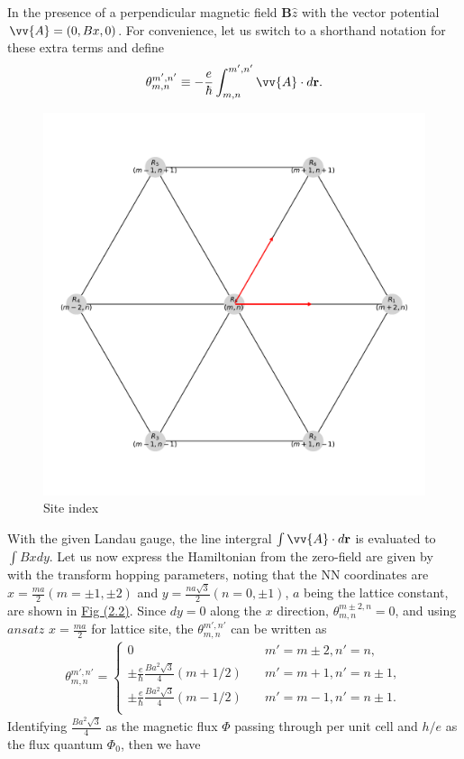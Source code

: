 \documentclass{report}
\newcommand{\f}[2]{\dfrac{#1}{#2}}
\begin{document}
In the presence of a perpendicular magnetic field $\mathbf{B} \hat{z}$ with the vector potential $\vv{A} = (0, Bx, 0)$. For convenience, let us switch to a shorthand notation for these extra terms and define
\begin{gather}
	\theta_{m,n}^{m',n'} \equiv - \f{e}{\hbar} \int_{m,n}^{m',n'} \vv{A} \cdot d\mathbf{r}.
\end{gather}
\begin{figure}[H]
	\centering
	\includegraphics[width=0.5\linewidth,height=0.5\linewidth]{pic/siteindice.pdf}
	\caption{\label{fig:site index} Site index}
\end{figure}
With the given Landau gauge, the line intergral $\int \vv{A} \cdot d\mathbf{r}$ is evaluated to $\int Bx dy$. Let us now express the Hamiltonian from the zero-field are given by \cite{PhysRevB.88.085433} with the transform hopping parameters, noting that the NN coordinates are $x = \frac{ma}{2}(m = \pm 1, \pm 2)$ and $y = \frac{na\sqrt{3}}{2}(n = 0,\pm 1)$, $a$ being the lattice constant, are shown in \hyperref[fig:site index]{Fig (2.2)}. Since $dy = 0$ along the $x$ direction, $\theta_{m,n}^{m \pm 2, n} = 0$, and using $ansatz$ $x = \frac{ma}{2}$ for lattice site, the $\theta_{m,n}^{m',n'}$ can be written as
\begin{gather}
	\theta_{m,n}^{m',n'} =
	\begin{cases}
		0                                                         & \quad m' = m \pm 2, n' = n  ,    \\
		\pm \frac{e}{\hbar} \frac{B a^{2} \sqrt{3}}{4} (m + 1 /2) & \quad m' = m + 1, n' = n \pm 1 , \\
		\pm \frac{e}{\hbar} \frac{B a^{2} \sqrt{3}}{4} (m - 1 /2) & \quad m' = m - 1, n' = n \pm 1.  \\
	\end{cases}
\end{gather}
Identifying $\frac{B a^{2} \sqrt{3}}{4}$ as the magnetic flux $\Phi$ passing through per unit cell and $h / e$ as the flux quantum $\Phi_{0}$, then we have
\end{document}
